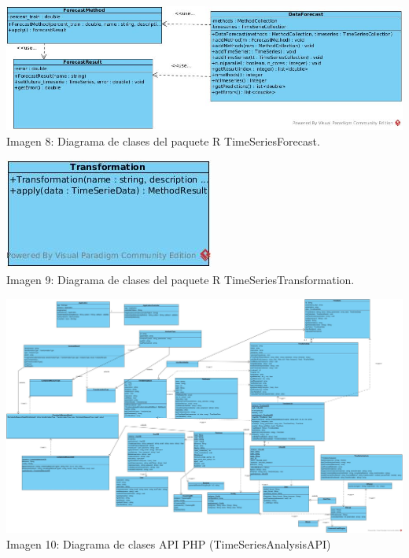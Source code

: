 \documentclass[14pt]{extarticle}
\theoremstyle{definition}
\theoremstyle{remark}
\begin{document}
\begin{landscape}
	\begin{center}
		\includegraphics[scale=0.6]{ForecastR.jpg}
		\\Imagen 8: Diagrama de clases del paquete R TimeSeriesForecast.
	\end{center}
	\begin{center}
		\includegraphics[scale=0.6]{TransformationR.jpg}
		\\Imagen 9: Diagrama de clases del paquete R TimeSeriesTransformation.
	\end{center}
\end{landscape}

\begin{landscape}
	\begin{center}
	\includegraphics[scale=0.25]{TimeSeriesAnalysisAPI.jpg}
	\\Imagen 10: Diagrama de clases API PHP (TimeSeriesAnalysisAPI)
	\end{center}
\end{landscape}
\end{document}

